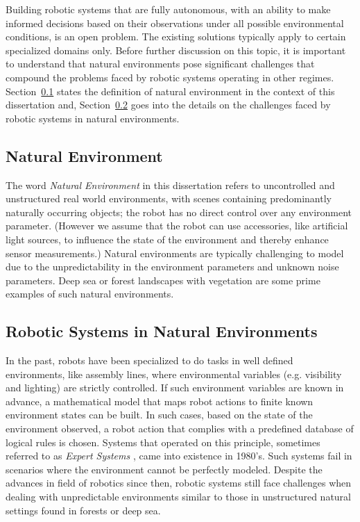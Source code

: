 \documentclass {udthesis}
\begin{document}
Building robotic systems that are fully autonomous, with an ability to make informed decisions based on their observations under all possible environmental conditions, is an open problem.
The existing solutions typically apply to certain specialized domains only. 
Before further discussion on this topic, it is important to
understand that natural environments pose significant challenges that compound the problems faced by robotic systems operating in other regimes.
Section~\ref{sec:nat_environ_def} states the definition of natural environment in the context of this dissertation and, Section~\ref{sec:robots_nat_environ} goes into the details on the challenges faced by robotic systems in natural environments.


\subsection{Natural Environment}
\label{sec:nat_environ_def}

The word \emph{Natural Environment} in this dissertation refers to uncontrolled and unstructured real world environments, with scenes containing predominantly naturally occurring objects; the robot has 
no direct control over any environment parameter. (However we assume that the robot can use accessories, like artificial light sources, to influence the state of the environment and thereby enhance sensor measurements.) 
Natural environments are typically challenging to model due to the unpredictability in the environment parameters and unknown noise parameters. 
Deep sea or forest landscapes with vegetation are some prime examples of such natural environments.


\subsection{Robotic Systems in Natural Environments}
\label{sec:robots_nat_environ}

In the past, robots have been specialized to do tasks in well defined environments, like assembly lines, where environmental variables (e.g. visibility and lighting) are strictly controlled. If such environment variables are known in advance, a mathematical model that maps robot actions to finite known environment states can be built. In such cases, based on the state of the environment observed, a robot action that complies with a predefined database of logical rules is chosen. Systems that operated on this principle, sometimes referred to as \emph{Expert Systems} 
\cite{russel}, came into existence in 1980's. Such systems fail in scenarios where the environment cannot be perfectly modeled. Despite the advances in field of robotics since then, robotic systems still face challenges when dealing with unpredictable environments similar to those in unstructured natural settings found in forests or deep sea.
\end{document}
